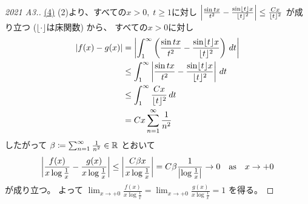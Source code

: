 \documentclass[report]{jlreq}
\begin{document}
\begin{proof}[2021 A3.]
    \uline{(4)} \quad
    (2)より、すべての$x > 0, \; t \ge 1$に対し
    $\left|{
        \frac{\sin tx}{t^2}
        -
        \frac{\sin \lfloor t \rfloor x}{\lfloor t \rfloor^2}
    }\right|
        \le
            \frac{Cx}{\lfloor t \rfloor^2}$
    が成り立つ ($\lfloor \cdot \rfloor$は床関数) から、
    すべての$x > 0$に対し
    \begin{alignat}{1}
        |f(x) - g(x)|
            &=
                \left|{
                    \int_1^\infty
                        \left({
                            \frac{\sin tx}{t^2}
                            -
                            \frac{\sin \lfloor t \rfloor x}{\lfloor t \rfloor^2}
                        }\right)
                        \, dt
                }\right|
                \\
            &\le
                \int_1^\infty
                    \left|{
                        \frac{\sin tx}{t^2}
                        -
                        \frac{\sin \lfloor t \rfloor x}{\lfloor t \rfloor^2}
                    }\right|
                    \, dt
                \\
            &\le
                \int_1^\infty
                    \frac{Cx}{\lfloor t \rfloor^2}
                    \, dt
                \\
            &=
                Cx \sum_{n = 1}^\infty
                    \frac{1}{n^2}
    \end{alignat}
    したがって
    $\beta \coloneqq \sum_{n = 1}^\infty \frac{1}{n^2} \in \mathbb{R}$
    とおいて
    \begin{equation}
        \left|{
            \frac{f(x)}{x \log \frac{1}{x}}
            -
            \frac{g(x)}{x \log \frac{1}{x}}
        }\right|
            \le
                \left|{
                    \frac{C \beta x}{x \log \frac{1}{x}}
                }\right|
            =
                C \beta \frac{1}{\left|{
                    \log \frac{1}{x}
                }\right|}
            \to
                0
                \quad
                \text{as}
                \quad
                x \to +0
    \end{equation}
    が成り立つ。
    よって
    $\lim_{x \to +0}
        \frac{f(x)}{x \log \frac{1}{x}}
        =
        \lim_{x \to +0}
        \frac{g(x)}{x \log \frac{1}{x}}
        =
        1$
    を得る。
\end{proof}
\end{document}
